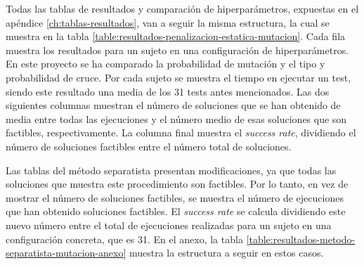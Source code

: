 Todas las tablas de resultados y comparación de hiperparámetros, expuestas en el apéndice \ref{ch:tablas-resultados}, van a seguir la misma estructura, la cual se muestra en la tabla \ref{table:resultados-penalizacion-estatica-mutacion}. Cada fila muestra los resultados para un sujeto en una configuración de hiperparámetros. En este proyecto se ha comparado la probabilidad de mutación y el tipo y probabilidad de cruce. Por cada sujeto se muestra el tiempo en ejecutar un test, siendo este resultado una media de los 31 tests antes mencionados. Las dos siguientes columnas muestran el número de soluciones que se han obtenido de media entre todas las ejecuciones y el número medio de esas soluciones que son factibles, respectivamente. La columna final muestra el \textit{success rate}, dividiendo el número de soluciones factibles entre el número total de soluciones.

Las tablas del método separatista presentan modificaciones, ya que todas las soluciones que muestra este procedimiento son factibles. Por lo tanto, en vez de mostrar el número de soluciones factibles, se muestra el número de ejecuciones que han obtenido soluciones factibles. El \textit{success rate} se calcula dividiendo este nuevo número entre el total de ejecuciones realizadas para un sujeto en una configuración concreta, que es 31. En el anexo, la tabla \ref{table:resultados-metodo-separatista-mutacion-anexo} muestra la estructura a seguir en estos casos.

